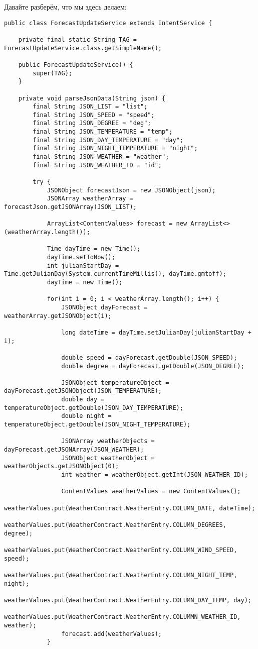 \documentclass[12 pt]{article}
\begin{document}
    Давайте разберём, что мы здесь делаем:
    \begin{lstlisting}
public class ForecastUpdateService extends IntentService {

    private final static String TAG = ForecastUpdateService.class.getSimpleName();

    public ForecastUpdateService() {
        super(TAG);
    }

    private void parseJsonData(String json) {
        final String JSON_LIST = "list";
        final String JSON_SPEED = "speed";
        final String JSON_DEGREE = "deg";
        final String JSON_TEMPERATURE = "temp";
        final String JSON_DAY_TEMPERATURE = "day";
        final String JSON_NIGHT_TEMPERATURE = "night";
        final String JSON_WEATHER = "weather";
        final String JSON_WEATHER_ID = "id";

        try {
            JSONObject forecastJson = new JSONObject(json);
            JSONArray weatherArray = forecastJson.getJSONArray(JSON_LIST);

            ArrayList<ContentValues> forecast = new ArrayList<>(weatherArray.length());

            Time dayTime = new Time();
            dayTime.setToNow();
            int julianStartDay = Time.getJulianDay(System.currentTimeMillis(), dayTime.gmtoff);
            dayTime = new Time();

            for(int i = 0; i < weatherArray.length(); i++) {
                JSONObject dayForecast = weatherArray.getJSONObject(i);

                long dateTime = dayTime.setJulianDay(julianStartDay + i);

                double speed = dayForecast.getDouble(JSON_SPEED);
                double degree = dayForecast.getDouble(JSON_DEGREE);

                JSONObject temperatureObject = dayForecast.getJSONObject(JSON_TEMPERATURE);
                double day = temperatureObject.getDouble(JSON_DAY_TEMPERATURE);
                double night = temperatureObject.getDouble(JSON_NIGHT_TEMPERATURE);

                JSONArray weatherObjects = dayForecast.getJSONArray(JSON_WEATHER);
                JSONObject weatherObject = weatherObjects.getJSONObject(0);
                int weather = weatherObject.getInt(JSON_WEATHER_ID);

                ContentValues weatherValues = new ContentValues();
                weatherValues.put(WeatherContract.WeatherEntry.COLUMN_DATE, dateTime);
                weatherValues.put(WeatherContract.WeatherEntry.COLUMN_DEGREES, degree);
                weatherValues.put(WeatherContract.WeatherEntry.COLUMN_WIND_SPEED, speed);
                weatherValues.put(WeatherContract.WeatherEntry.COLUMN_NIGHT_TEMP, night);
                weatherValues.put(WeatherContract.WeatherEntry.COLUMN_DAY_TEMP, day);
                weatherValues.put(WeatherContract.WeatherEntry.COLUMMN_WEATHER_ID, weather);
                forecast.add(weatherValues);
            }


\end{lstlisting}
\end{document}
